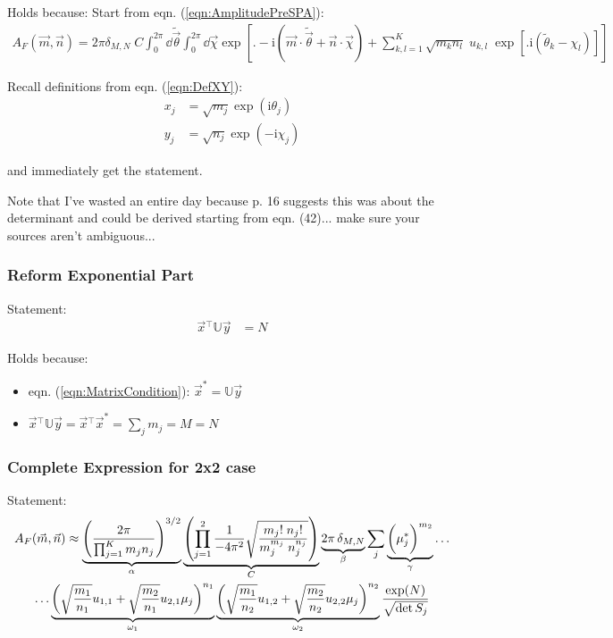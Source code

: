 \documentclass[
	english,
	a4paper,
	fontsize=10pt,
	parskip=half,
	titlepage=true,
	DIV=12,
	final
]{scrreprt}
\newcommand*{\transp}{\ensuremath{^\intercal}}
\newcommand*{\iunit}{\ensuremath{\mathrm{i}}}
\begin{document}
Holds because:
Start from eqn. (\ref{eqn:AmplitudePreSPA}):
\begin{align*}
	A_F(\vec{m}, \vec{n})
=
	2 \pi \delta_{M, N} \; C
	\int_{0}^{2\pi} \dd{\tilde{\vec{\theta}}}
	\int_{0}^{2\pi} \dd{\vec{\chi}} 
		\exp[ \Bigg. -\iunit(\vec{m} \cdot \tilde{\vec{\theta}}  +  \vec{n} \cdot \vec{\chi}) 
		+ 
		\sum_{k,l=1}^{K} \sqrt{m_k n_l} \; u_{k,l} \; 
			\exp[ \Big. \iunit(\tilde{\theta}_k - \chi_l)] 
		]
\end{align*}

Recall definitions from eqn. (\ref{eqn:DefXY}):
\begin{align*}
	x_j &= \sqrt{m_j} \exp( \iunit \theta_j) \\
	y_j &= \sqrt{n_j} \exp(-\iunit \chi  _j)
\end{align*}

and immediately get the statement.

{\color{red} Note that I've wasted an entire day because p. 16 suggests this was about the determinant and could be derived starting from eqn. (42)... make sure your sources aren't ambiguous...}

\subsubsection{Reform Exponential Part}
Statement:
\begin{align}
	\vec{x}\transp
	\mathbb{U}
	\vec{y}
&=
	N
\end{align}

Holds because:
\begin{itemize}
\item eqn. (\ref{eqn:MatrixCondition}):
	$\vec{x}^{*} = \mathbb{U} \vec{y}$
\item $\vec{x}\transp \mathbb{U} \vec{y} = \vec{x}\transp \vec{x}^{*} = \sum_{j} m_j = M = N$
\end{itemize}


\subsubsection{Complete Expression for 2x2 case}
Statement:
\begin{multline}
	A_F(\vec{m}, \vec{n})
\approx
	\underbrace{
		\qty(\frac
			{2\pi}
			{\prod_{j=1}^{K} m_j n_j}
		)^{3/2}
	}_{\alpha}
	\underbrace{
	\qty(
		\prod_{j=1}^{2}
		\frac
			{1}
			{-4\pi^{2}}
		\sqrt{\frac
			{m_j!      \; n_j!}
			{m_j^{m_j} \; n_j^{n_j} }
		}
	)}_{C}
	\underbrace{2\pi \, \delta_{M,N}}_{\beta}
	\sum_{j}
		\underbrace{ \qty(\bigg. \mu_j^*)^{m_2} }_{\gamma}
	\ldots
\\
	\ldots
		\underbrace{
			\qty(\sqrt{\frac{m_1}{n_1}} u_{1,1}  +  \sqrt{\frac{m_2}{n_1}} u_{2,1} \mu_{j})^{n_1}
		}_{\omega_{1}}
		\underbrace{
			\qty(\sqrt{\frac{m_1}{n_2}} u_{1,2}  +  \sqrt{\frac{m_2}{n_2}} u_{2,2} \mu_{j})^{n_2}
		}_{\omega_{2}}
	\frac
		{\exp(N)}
		{\sqrt{\det S_j}}
\end{multline}
\end{document}
